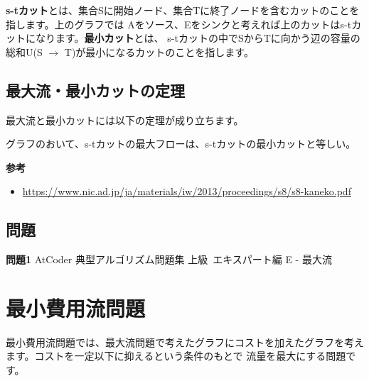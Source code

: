 \vspace{0.5cm}

\textbf{s-tカット}とは、集合Sに開始ノード、集合Tに終了ノードを含むカットのことを指します。上のグラフでは
Aをソース、Eをシンクと考えれば上のカットはs-tカットになります。\textbf{最小カット}とは、
s-tカットの中でSからTに向かう辺の容量の総和U(S $\rightarrow$ T)が最小になるカットのことを指します。

\subsection{最大流・最小カットの定理}
最大流と最小カットには以下の定理が成り立ちます。

\begin{theorembox}
  グラフのおいて、s-tカットの最大フローは、s-tカットの最小カットと等しい。
\end{theorembox}



\textbf{参考}

\begin{itemize}
  \item \url{https://www.nic.ad.jp/ja/materials/iw/2013/proceedings/s8/s8-kaneko.pdf}
\end{itemize}

\subsection{問題}
\textbf{問題1} AtCoder 典型アルゴリズム問題集 上級~エキスパート編 E - 最大流

\newpage

\section{最小費用流問題}
最小費用流問題では、最大流問題で考えたグラフにコストを加えたグラフを考えます。コストを一定以下に抑えるという条件のもとで
流量を最大にする問題です。

\vspace{0.5cm}

\begin{center}
\end{center}

